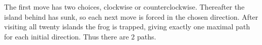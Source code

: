 The first move has two choices, clockwise or counterclockwise. Thereafter the island behind has sunk, so each next move is forced in the chosen direction. After visiting all twenty islands the frog is trapped, giving exactly one maximal path for each initial direction. Thus there are $\boxed2$ paths.
